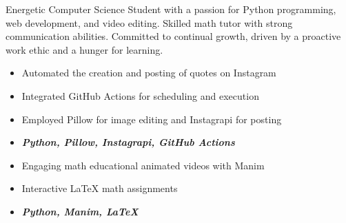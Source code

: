 \documentclass[10pt,a4paper,ragged2e,withhyper]{altacv}
\begin{document}

\makecvheader



\begin{paracol}{2}

Energetic Computer Science Student with a passion for Python programming, web development, and video editing. Skilled math tutor with strong communication abilities. Committed to continual growth, driven by a proactive work ethic and a hunger for learning.



\begin{itemize}
\item Automated the creation and posting of quotes on Instagram
\item Integrated GitHub Actions for scheduling and execution
\item Employed Pillow for image editing and Instagrapi for posting
\item \textbf{\textit{Python, Pillow, Instagrapi, GitHub Actions}}
\end{itemize}

\divider


\begin{itemize}
  \item Engaging math educational animated videos with Manim
  \item Interactive LaTeX math assignments
  \item \textbf{\textit{Python, Manim, LaTeX}}
  \end{itemize}
  


\end{paracol}
\end{document}

